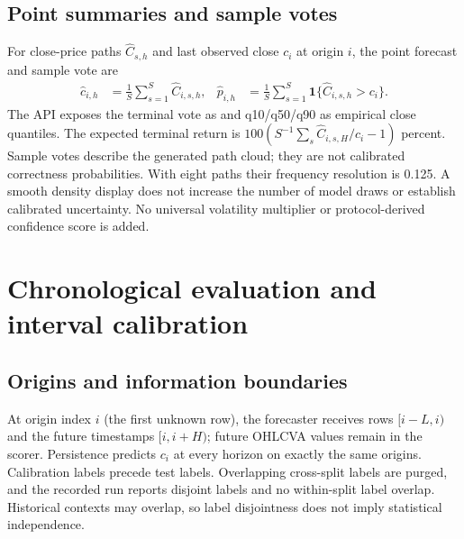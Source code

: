 \documentclass[11pt,a4paper]{article}
\newcommand{\code}[1]{\texttt{\detokenize{#1}}}
\begin{document}
\subsection{Point summaries and sample votes}
For close-price paths $\widehat C_{s,h}$ and last observed close $c_i$ at origin
$i$, the point forecast and sample vote are
\begin{align}
\widehat c_{i,h}&=\frac{1}{S}\sum_{s=1}^{S}\widehat C_{i,s,h}, &
\widehat p_{i,h}&=\frac{1}{S}\sum_{s=1}^{S}\mathbf 1\{\widehat C_{i,s,h}>c_i\}.
\end{align}
The API exposes the terminal vote as \code{p_up} and q10/q50/q90 as empirical
close quantiles. The expected terminal return is
$100(S^{-1}\sum_s\widehat C_{i,s,H}/c_i-1)$ percent. Sample votes describe the
generated path cloud; they are not calibrated correctness probabilities.
With eight paths their frequency resolution is 0.125. A smooth density display
does not increase the number of model draws or establish calibrated uncertainty.
No universal volatility multiplier or protocol-derived confidence score is added.

\section{Chronological evaluation and interval calibration}
\subsection{Origins and information boundaries}
At origin index $i$ (the first unknown row), the forecaster receives rows
$[i-L,i)$ and the future timestamps $[i,i+H)$; future OHLCVA values remain in the
scorer. Persistence predicts $c_i$ at every horizon on exactly the same origins.
Calibration labels precede test labels. Overlapping cross-split labels are
purged, and the recorded run reports disjoint labels and no within-split label
overlap. Historical contexts may overlap, so label disjointness does not imply
statistical independence.

\begin{table}[htbp]
\centering\footnotesize

\caption{Earlier integration Kronos-base evaluation. Origin indices are zero-based; all label
times are UTC. Each split has four eight-bar windows. Test origins are
464, 472, 480, and 488.}
\label{tab:splits}
\end{table}
\end{document}
